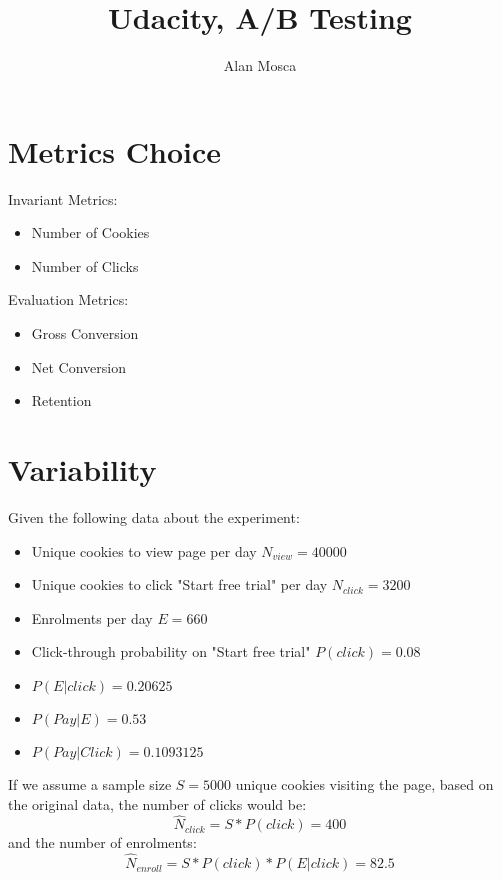 \documentclass[12pt,a4paper]{article}
\begin{document}
\title{Udacity, A/B Testing}
\author{Alan Mosca}

\maketitle

\section{Metrics Choice}

Invariant Metrics:

\begin{itemize}
\item Number of Cookies
\item Number of Clicks
\end{itemize}

Evaluation Metrics:

\begin{itemize}
\item Gross Conversion
\item Net Conversion
\item Retention
\end{itemize}

\section{Variability}
Given the following data about the experiment:
\begin{itemize}
\item Unique cookies to view page per day $N_{view} = 40000$
\item Unique cookies to click "Start free trial" per day $N_{click} = 3200$
\item Enrolments per day $E = 660$
\item Click-through probability on "Start free trial" $P(click) = 0.08$
\item $P(E|click) = 0.20625$
\item $P(Pay|E) = 0.53$
\item $P(Pay|Click) = 0.1093125$
\end{itemize}

If we assume a sample size $S = 5000$ unique cookies visiting the page, based on
the original data, the number of clicks would be:
\begin{equation}
\hat{N}_{click} = S * P(click) = 400
\end{equation}
and the number of enrolments:
\begin{equation}
\hat{N}_{enroll} = S * P(click) * P(E|click) = 82.5
\end{equation}
\end{document}
